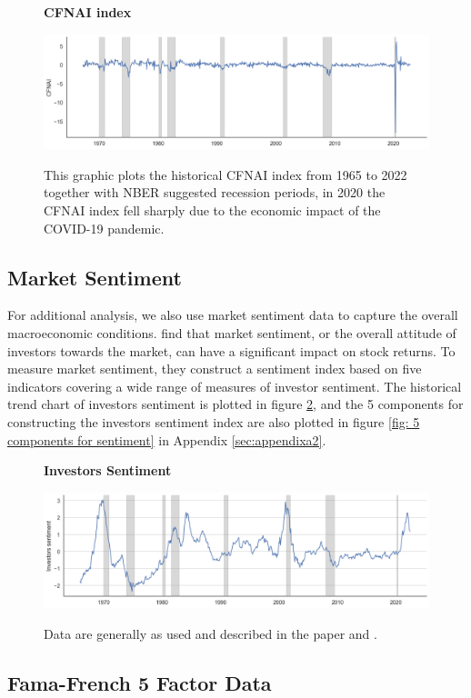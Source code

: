 \begin{figure}[H]
  \centering
  \caption{\textbf{CFNAI index}}
  \includegraphics[width=.8\textwidth]{images/cfnai.png}
  \label{fig: CFNAI index}
  \caption*{\footnotesize{This graphic plots the historical CFNAI index from 1965 to 2022 together with NBER suggested recession periods, in 2020 the CFNAI index fell sharply due to the economic impact of the COVID-19 pandemic.}}
\end{figure} 

\subsection{Market Sentiment}
For additional analysis, we also use market sentiment data to capture the overall macroeconomic conditions. \citet*{baker2007investor} find that market sentiment, or the overall attitude of investors towards the market, can have a significant impact on stock returns. To measure market sentiment, they construct a sentiment index based on five indicators covering a wide range of measures of investor sentiment. The historical trend chart of investors sentiment is plotted in figure \ref{fig: sentiment index}, and the 5 components for constructing the investors sentiment index are also plotted in figure \ref{fig: 5 components for sentiment} in Appendix \ref{sec:appendixa2}.

\begin{figure}[H]
  \centering
  \caption{\textbf{Investors Sentiment}}
  \includegraphics[width=.8\textwidth]{images/sentiment.png}
  \label{fig: sentiment index}
  \caption*{\footnotesize{Data are generally as used and described in the paper \citet*{baker2007investor} and \citet*{baker2006investor}.}}
\end{figure} 

\subsection{Fama-French 5 Factor Data}

